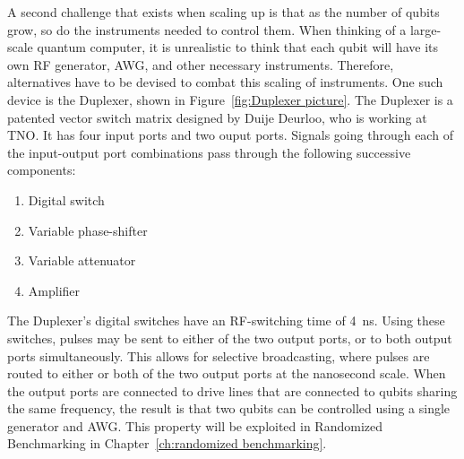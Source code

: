       A second challenge that exists when scaling up is that as the number of qubits grow, so do the instruments needed to control them. When thinking of a large-scale quantum computer, it is unrealistic to think that each qubit will have its own RF generator, AWG, and other necessary instruments. Therefore, alternatives have to be devised to combat this scaling of instruments. One such device is the Duplexer, shown in Figure~\ref{fig:Duplexer picture}. The Duplexer is a patented vector switch matrix designed by Duije Deurloo, who is working at TNO. It has four input ports and two ouput ports. Signals going through each of the input-output port combinations pass through the following successive components:

      \begin{enumerate}
        \item Digital switch
        \item Variable phase-shifter
        \item Variable attenuator
        \item Amplifier
      \end{enumerate}

      The Duplexer's digital switches have an RF-switching time of \SI{4}{\nano \second}. Using these switches, pulses may be sent to either of the two output ports, or to both output ports simultaneously. This allows for selective broadcasting, where pulses are routed to either or both of the two output ports at the nanosecond scale. When the output ports are connected to drive lines that are connected to qubits sharing the same frequency, the result is that two qubits can be controlled using a single generator and AWG. This property will be exploited in Randomized Benchmarking in Chapter~\ref{ch:randomized benchmarking}.

